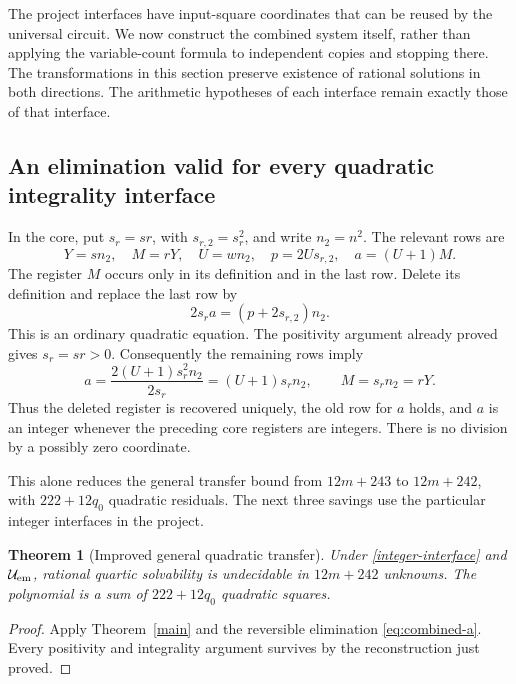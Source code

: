 \documentclass[11pt]{article}
\newtheorem{theorem}{Theorem}
\begin{document}
The project interfaces have input-square coordinates that can be reused by
the universal circuit. We now construct the combined system itself, rather
than applying the variable-count formula to independent copies and stopping
there. The transformations in this section preserve existence of rational
solutions in both directions. The arithmetic hypotheses of each interface
remain exactly those of that interface.

\subsection{An elimination valid for every quadratic integrality interface}
In the core, put \(s_r=sr\), with \(s_{r,2}=s_r^2\), and write
\(n_2=n^2\). The relevant rows are
\[
 Y=sn_2,\quad M=rY,\quad U=wn_2,\quad
 p=2U s_{r,2},\quad a=(U+1)M.
\]
The register \(M\) occurs only in its definition and in the last row.
Delete its definition and replace the last row by
\begin{equation}\label{eq:combined-a}
                  2s_r a=(p+2s_{r,2})n_2.
\end{equation}
This is an ordinary quadratic equation. The positivity argument already
proved gives \(s_r=sr>0\). Consequently the remaining rows imply
\[
 a=\frac{2(U+1)s_r^2n_2}{2s_r}=(U+1)s_rn_2,
 \qquad M=s_rn_2=rY.
\]
Thus the deleted register is recovered uniquely, the old row for \(a\)
holds, and \(a\) is an integer whenever the preceding core registers are
integers. There is no division by a possibly zero coordinate.

This alone reduces the general transfer bound from \(12m+243\) to
\(12m+242\), with \(222+12q_0\) quadratic residuals. The next three
savings use the particular integer interfaces in the project.

\begin{theorem}[Improved general quadratic transfer]
Under \eqref{integer-interface} and $\mathcal U_{\rm em}$, rational quartic
solvability is undecidable in $12m+242$ unknowns. The polynomial is a sum
of $222+12q_0$ quadratic squares.
\end{theorem}
\begin{proof}
Apply Theorem~\ref{main} and the reversible elimination
\eqref{eq:combined-a}. Every positivity and integrality argument survives
by the reconstruction just proved.
\end{proof}
\end{document}
